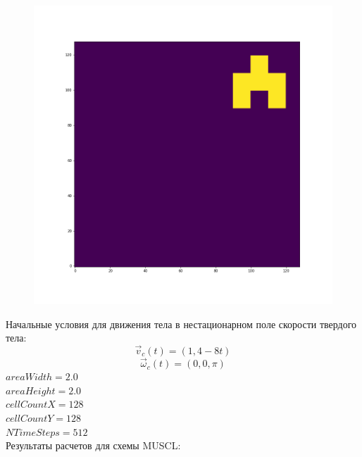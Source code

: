 \documentclass[12pt,a4paper]{article}
\begin{document}
\begin{figure}[H]
\begin{minipage}{.3\textwidth}
\end{minipage}%
\begin{minipage}{.3\textwidth}
  \centering
  \includegraphics[width=\linewidth]{Pictures/Solve2DWhiteBearMovementTestJR/Solve2DWhiteBearMovementTest_t50.png}
\end{minipage}
\end{figure}

Начальные условия для движения тела в нестационарном поле скорости твердого тела:
\[
\overrightarrow{v}_c(t)=(1, 4-8t)
\]
\[
\overrightarrow{\omega}_c(t)=(0, 0, \pi)
\]
$areaWidth=2.0$\\
$areaHeight=2.0$\\
$cellCountX=128$\\
$cellCountY=128$\\
$NTimeSteps=512$\\

Результаты расчетов для схемы MUSCL:
\end{document}
